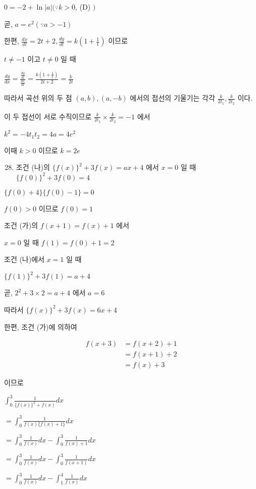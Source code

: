 \documentclass[10pt]{article}
\begin{document}
$0=-2+\ln |a|(\because k>0$, (D) $)$

곧, $a=e^{2}(\because a>-1)$

한편, $\frac{d x}{d t}=2 t+2, \frac{d y}{d t}=k\left(1+\frac{1}{t}\right)$ 이므로

$t \neq-1$ 이고 $t \neq 0$ 일 때

$\frac{d y}{d x}=\frac{\frac{d y}{d t}}{\frac{d x}{d t}}=\frac{k\left(1+\frac{1}{t}\right)}{2 t+2}=\frac{k}{2 t}$

따라서 곡선 위의 두 점 $(a, b),(a,-b)$ 에서의 접선의 기울기는 각각 $\frac{k}{2 t_{1}}, \frac{k}{2 t_{2}}$ 이다.

이 두 접선이 서로 수직이므로 $\frac{k}{2 t_{1}} \times \frac{k}{2 t_{2}}=-1$ 에서

$k^{2}=-4 t_{1} t_{2}=4 a=4 e^{2}$

이때 $k>0$ 이므로 $k=2 e$

\begin{enumerate}
  \setcounter{enumi}{27}
  \item 조건 (나)의 $\{f(x)\}^{2}+3 f(x)=a x+4$ 에서 $x=0$ 일 때 $\{f(0)\}^{2}+3 f(0)=4$
\end{enumerate}

$\{f(0)+4\}\{f(0)-1\}=0$

$f(0)>0$ 이므로 $f(0)=1$

조건 (가)의 $f(x+1)=f(x)+1$ 에서

$x=0$ 일 때 $f(1)=f(0)+1=2$

조건 (나)에서 $x=1$ 일 때

$\{f(1)\}^{2}+3 f(1)=a+4$

곧, $2^{2}+3 \times 2=a+4$ 에서 $a=6$

따라서 $\{f(x)\}^{2}+3 f(x)=6 x+4$

한편, 조건 (가)에 의하여

\[
\begin{aligned}
f(x+3) & =f(x+2)+1 \\
& =f(x+1)+2 \\
& =f(x)+3
\end{aligned}
\]

이므로

$\int_{0}^{3} \frac{1}{\{f(x)\}^{2}+f(x)} d x$

$=\int_{0}^{3} \frac{1}{f(x)\{f(x)+1\}} d x$

$=\int_{0}^{3} \frac{1}{f(x)} d x-\int_{0}^{3} \frac{1}{f(x)+1} d x$

$=\int_{0}^{3} \frac{1}{f(x)} d x-\int_{0}^{3} \frac{1}{f(x+1)} d x$

$=\int_{0}^{3} \frac{1}{f(x)} d x-\int_{1}^{4} \frac{1}{f(x)} d x$
\end{document}
